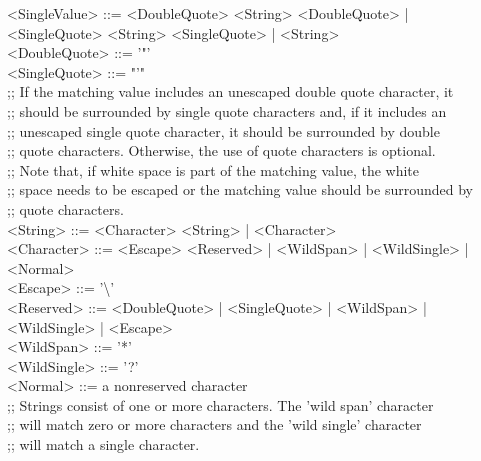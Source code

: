 \settowidth{\uL}{<SingleValue> ::= }%
<SingleValue> ::= <DoubleQuote> <String> <DoubleQuote> |\\
\hspace*{\uL}<SingleQuote> <String> <SingleQuote> | <String>\\
<DoubleQuote> ::= '"'\\
<SingleQuote> ::= "'"\\
;; If the matching value includes an unescaped double quote character, it\\
;; should be surrounded by single quote characters and, if it includes an\\
;; unescaped single quote character, it should be surrounded by double\\
;; quote characters. Otherwise, the use of quote characters is optional.\\
;; Note that, if white space is part of the matching value, the white\\
;; space needs to be escaped or the matching value should be surrounded by\\
;; quote characters.\\
\newpage
<String> ::= <Character> <String> | <Character>\\
\settowidth{\uL}{<Character> ::= }%
<Character> ::= <Escape> <Reserved> | <WildSpan> | <WildSingle> |\\
\hspace*{\uL}<Normal>\\
<Escape> ::= '\textbackslash'\\
\settowidth{\uL}{<Reserved> ::= }%
<Reserved> ::= <DoubleQuote> | <SingleQuote> | <WildSpan> |\\
\hspace*{\uL}<WildSingle> | <Escape>\\
<WildSpan> ::= '*'\\
<WildSingle> ::= '?'\\
<Normal> ::= a non\longDash{}reserved character\\
;; Strings consist of one or more characters. The 'wild span' character\\
;; will match zero or more characters and the 'wild single' character\\
;; will match a single character.
\outputEnd{}
\appendixEnd{}
